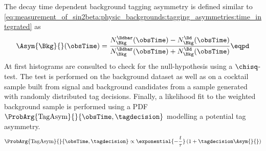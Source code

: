 The decay time dependent background tagging asymmetry is defined similar to 
\cref{eq:measurement_of_sin2beta:physic_backgrounds:tagging_asymmetries:time_integrated} as
%
\begin{equation}\label{eq:measurement_of_sin2beta:physic_backgrounds:tagging_asymmetries:time_dependent}
  \Asym{\Bkg}{}(\obsTime) = \frac{N_{\Bkg}^{\Bdbar}(\obsTime) - N_{\Bkg}^{\Bd}(\obsTime)}{N_{\Bkg}^{\Bdbar}(\obsTime) + N_{\Bkg}^{\Bd}(\obsTime)}\eqpd
\end{equation}
%
At first histograms are consulted to check for the null-hypothesis using a
$\chisq$-test. The test is performed on the background \sweighted dataset as
well as on a cocktail \MC sample built from signal \MC and background candidates
from a \ToyMC sample generated with randomly distributed tag decisions. Finally,
a likelihood fit to the weighted background sample is performed using a \ac{PDF}
$\ProbArg{\text{TagAsym}}{}{\obsTime, \tagdecision}$ modelling a potential tag asymmetry.
%
\begin{equation}\label{eq:measurement_of_sin2beta:physic_backgrounds:tagging_asymmetries:time_dependent:pdf}
  \ProbArg{\text{TagAsym}}{}{\obsTime, \tagdecision} \propto \exponential{- \frac{t}{\tau}} \left( 1 + \tagdecision \Asym{}{} \right)
\end{equation}

